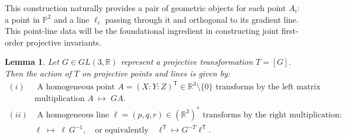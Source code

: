 \documentclass[12pt,reqno]{amsart}
\newtheorem{lemma}{Lemma}
\begin{document}
This construction naturally provides a pair of geometric objects for each point $A_i$: a point in $\mathbb{P}^2$ and a line $\ell_i$ passing through it and orthogonal to its gradient  line. This point-line data will be the foundational ingredient in constructing joint first-order projective invariants.

\begin{lemma}\label{lem:point-line-action}
Let \(G\in GL(3,\mathbb{R})\) represent a projective transformation  
\(
T = [G].
\)
Then the action of \(T\) on projective points and lines is given by:
$$
\begin{array}{ll}
(i) &  \text{ A homogeneous point } A=(X:Y:Z)^{\mathsf{T}} \in \mathbb{R}^3\setminus\{0\} \text{ transforms by the {left} matrix }\\
    		& 		\text{multiplication  }		A \;\longmapsto\; G A.
      \\
(ii) & \text{ A homogeneous line } \ell = (p, q, r) \in (\mathbb{R}^3)^*  
      \text{ transforms by the {right} multiplication:}\\
			& 		
           \ell \;\longmapsto\; \ell\, G^{-1},
      \quad \text{or equivalently} \quad
      \ell^{\mathsf{T}} \mapsto G^{-T} \ell^{\mathsf{T}}.
    \end{array}
$$

\end{lemma}
\end{document}

